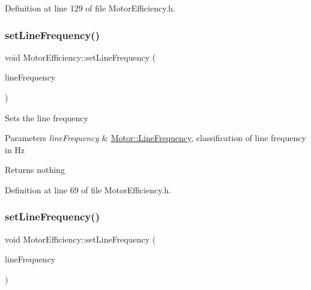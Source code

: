 Definition at line 129 of file Motor\+Efficiency.\+h.

\mbox{\label{class_motor_efficiency_a993b09941d330d3a46e0d72bd6dc65bb}} 
\subsubsection{\texorpdfstring{set\+Line\+Frequency()}{setLineFrequency()}\hspace{0.1cm}{\footnotesize\ttfamily [1/3]}}
{\footnotesize\ttfamily void Motor\+Efficiency\+::set\+Line\+Frequency (\begin{DoxyParamCaption}\item[{\hyperlink{class_motor_acee1bdf1b684ad36cb80dc2829d9fcee}{Motor\+::\+Line\+Frequency}}]{line\+Frequency }\end{DoxyParamCaption})\hspace{0.3cm}{\ttfamily [inline]}}

Sets the line frequency


\begin{DoxyParams}{Parameters}
{\em line\+Frequency} & \hyperlink{class_motor_acee1bdf1b684ad36cb80dc2829d9fcee}{Motor\+::\+Line\+Frequency}, classification of line frequency in Hz\\
\hline
\end{DoxyParams}
\begin{DoxyReturn}{Returns}
nothing 
\end{DoxyReturn}


Definition at line 69 of file Motor\+Efficiency.\+h.

\mbox{\label{class_motor_efficiency_a993b09941d330d3a46e0d72bd6dc65bb}} 
\subsubsection{\texorpdfstring{set\+Line\+Frequency()}{setLineFrequency()}\hspace{0.1cm}{\footnotesize\ttfamily [2/3]}}
{\footnotesize\ttfamily void Motor\+Efficiency\+::set\+Line\+Frequency (\begin{DoxyParamCaption}\item[{\hyperlink{class_motor_acee1bdf1b684ad36cb80dc2829d9fcee}{Motor\+::\+Line\+Frequency}}]{line\+Frequency }\end{DoxyParamCaption})\hspace{0.3cm}{\ttfamily [inline]}}

